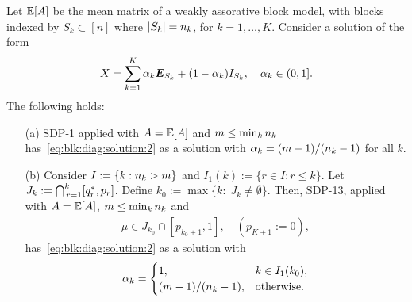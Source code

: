 \begin{prop}\label{prop:sdp13}
	Let $\mathbb{E}[A]$ be the mean matrix of a weakly assorative block model, with blocks indexed by $S_k \subset[n]$ where $|S_k| = n_k$, for $k=1,\dots,K$.
	Consider a solution of the form
	\begin{align}\label{eq:blk:diag:solution:2}
	X = \sum_{k=1}^K \alpha_k \bm{E}_{S_k} + (1-\alpha_k) I_{S_k}, \quad \alpha_k \in (0,1].
	\end{align} 
	The following holds:
	\begin{itemize}\itemsep=1.5ex
		\item[(a)]  SDP-1 applied with $A = \mathbb{E}[A]$ and $m \le \min_k n_k$ has~\eqref{eq:blk:diag:solution:2} as a solution with $\alpha_k = (m-1)/(n_k-1)$ for all $k$. 
		\item[(b)]   Consider $I := \{k: n_k > m\}$ and $I_1(k) := \{r \in I: r \le k\}$.
		 Let $J_k := \bigcap_{\,r =1}^k [q^*_r,p_r]$. Define $k_0 := \max\{k:\;  J_k \neq \emptyset\}$. Then, SDP-13, applied with $A = \mathbb{E}[A]$, $m \le \min_k n_k$ and 
		\begin{align*}
			\mu \in J_{k_0} \cap [p_{k_0+1},1] , \quad (p_{K+1} := 0),
		\end{align*}
		 has~\eqref{eq:blk:diag:solution:2} as a solution with
		\begin{align*}
			\alpha_k = 
			\begin{cases}
				1, & k \in I_1(k_0),\\
				(m-1)/(n_k-1), &\text{otherwise}.
			\end{cases}
		\end{align*}

	\end{itemize}
\end{prop}


